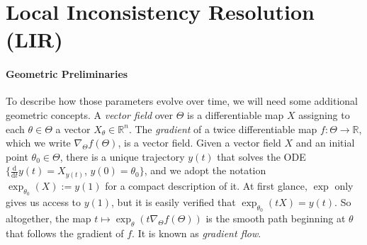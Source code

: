 \section{Local Inconsistency Resolution (LIR)}

\paragraph{Geometric Preliminaries}
To describe how those parameters evolve over time, we will need some additional geometric concepts.
A \emph{vector field} over $\Theta$ is a differentiable
    map $X$ assigning to each $\theta \in \Theta$ a vector $X_\theta \in \mathbb R^n$.
The \emph{gradient} of a twice differentiable map $f : \Theta \to \mathbb R$,
    which we write $\nabla_\Theta f(\Theta)$, is a vector field.
Given a vector field  $X$ and an initial point $\theta_0 \in \Theta$, there is a unique trajectory $y(t)$ that solves the ODE
$\{\frac{\mathrm d }{\mathrm d t}y(t) = X_{y(t)}$,  $y(0) = \theta_0\}$,
and we adopt the notation $\exp_{\theta_0}( X ) := y(1)$
    for a compact description of it.
At first glance,
 $\exp$ only gives us access to $y(1)$,
    but
     it is easily verified
     that $\exp_{\theta_0}(t X) = y(t)$.
So altogether, the map $t\mapsto \exp_\theta(t \nabla_\Theta f(\Theta))$ is the smooth path beginning at $\theta$ that follows the gradient of $f$. It is known as
\emph{gradient flow}.

